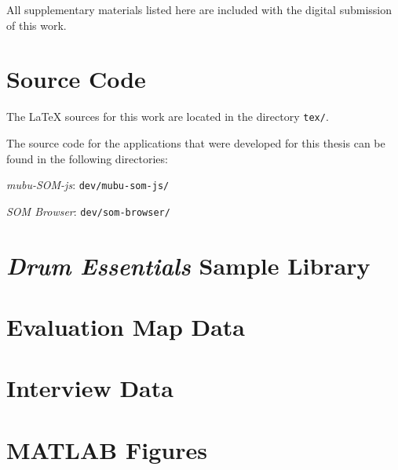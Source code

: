 
\begin{appendices}

All supplementary materials listed here are included with the digital
submission of this work.

\section{Source Code}

The {\LaTeX} sources for this work are located in the directory \texttt{tex/}.

\bigskip

\noindent
The source code for the applications that were developed for this thesis
can be found in the following directories:

\bigskip

\noindent
\textit{mubu-SOM-js}: \quad \texttt{dev/mubu-som-js/}

\bigskip

\noindent
\textit{SOM Browser}: \quad \texttt{dev/som-browser/}

\section{\textit{Drum Essentials} Sample Library}


\section{Evaluation Map Data}


\section{Interview Data}

\section{MATLAB Figures}



\end{appendices}
